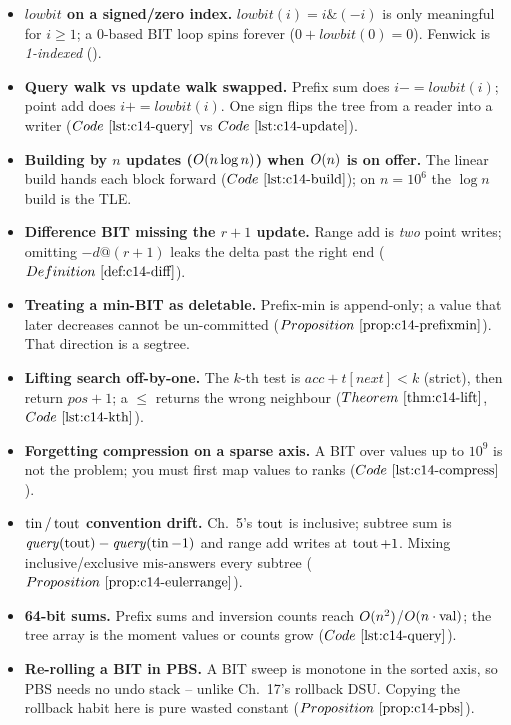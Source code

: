 \begin{itemize}[nosep, leftmargin=1.4em]
  \item \textbf{\(\mathit{lowbit}\) on a signed/zero index.} \(\mathit{lowbit}(i)=i\&(-i)\)
        is only meaningful for \(i\ge 1\); a 0-based BIT loop spins forever
        (\(0+\mathit{lowbit}(0)=0\)). Fenwick is \emph{1-indexed} ().
  \item \textbf{Query walk vs update walk swapped.} Prefix sum does
        \(i-=\mathit{lowbit}(i)\); point add does \(i+=\mathit{lowbit}(i)\). One
        sign flips the tree from a reader into a writer (\(\coderef{c14-query}\)
        vs \(\coderef{c14-update}\)).
  \item \textbf{Building by \(n\) updates (\(O(n\log n)\)) when \(O(n)\)
        is on offer.} The linear build hands each block forward
        (\(\coderef{c14-build}\)); on \(n=10^6\) the \(\log n\) build is the TLE.
  \item \textbf{Difference BIT missing the \(r+1\) update.} Range add is
        \emph{two} point writes; omitting \(-d@(r{+}1)\) leaks the delta past the
        right end (\(\defref{c14-diff}\)).
  \item \textbf{Treating a min-BIT as deletable.} Prefix-min is append-only; a
        value that later decreases cannot be un-committed
        (\(\propref{c14-prefixmin}\)). That direction is a segtree.
  \item \textbf{Lifting search off-by-one.} The \(k\)-th test is
        \(\mathit{acc}+t[\mathit{next}] < k\) (strict), then return
        \(\mathit{pos}+1\); a \(\le\) returns the wrong neighbour
        (\(\thmref{c14-lift}\), \(\coderef{c14-kth}\)).
  \item \textbf{Forgetting compression on a sparse axis.} A BIT over values up to
        \(10^9\) is not the problem; you must first map values to ranks
        (\(\coderef{c14-compress}\)).
  \item \textbf{\(\operatorname{tin}/\operatorname{tout}\) convention drift.} Ch.~5's \(\operatorname{tout}\) is inclusive;
        subtree sum is \(\mathit{query}(\operatorname{tout})-\mathit{query}(\operatorname{tin}-1)\) and range
        add writes at \(\operatorname{tout}+1\). Mixing inclusive/exclusive mis-answers every
        subtree (\(\propref{c14-eulerrange}\)).
  \item \textbf{64-bit sums.} Prefix sums and inversion counts reach
        \(O(n^2)\)/\(O(n\cdot\text{val})\); the tree array is
         the moment values or counts grow (\(\coderef{c14-query}\)).
  \item \textbf{Re-rolling a BIT in PBS.} A BIT sweep is monotone in the sorted
        axis, so PBS needs no undo stack -- unlike Ch.~17's rollback DSU. Copying
        the rollback habit here is pure wasted constant (\(\propref{c14-pbs}\)).
\end{itemize}

